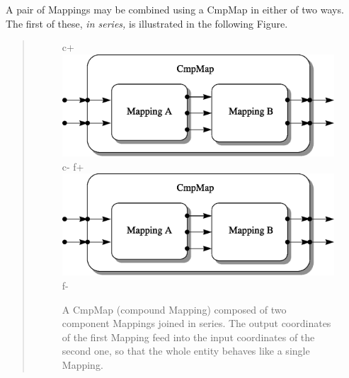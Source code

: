 \documentclass[twoside,11pt]{article}
\begin{document}
\begin{htmlonly}
   A pair of Mappings may be combined using a CmpMap in either of two
   ways. The first of these, {\em{in series,}} is illustrated in the
   following Figure.
   \begin{quote}
   \begin{figure}
   \label{fig:seriescmpmap}
c+
   \includegraphics[scale=1.0]{sun211_figures/series.eps}
c-
f+
   \includegraphics[scale=1.0]{sun210_figures/series.eps}
f-
   \caption{A CmpMap (compound Mapping) composed of two component
   Mappings joined in series. The output coordinates of the first Mapping
   feed into the input coordinates of the second one, so that the whole
   entity behaves like a single Mapping.}
   \end{figure}
   \end{quote}
\end{htmlonly}
\end{document}
